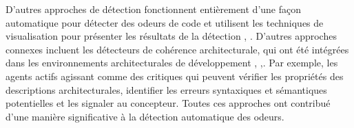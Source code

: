 \newline
D'autres approches de détection fonctionnent entièrement d’une façon automatique pour détecter des odeurs de code et utilisent les techniques de visualisation pour présenter les résultats de la détection \cite{lanza2007object}, \cite{van2002java}.
D'autres approches connexes incluent les détecteurs de cohérence architecturale, qui ont été intégrées dans les environnements architecturales de développement \cite{garlan1995architectural}, \cite{allen1997formal},\cite{dashofy2005comprehensive}.
Par exemple, les agents actifs agissant comme des critiques \cite{dashofy2005comprehensive} qui peuvent vérifier les propriétés des descriptions architecturales, identifier les erreurs syntaxiques et sémantiques potentielles et les signaler au concepteur.
Toutes ces approches ont contribué d’une manière significative à la détection automatique des odeurs. 
